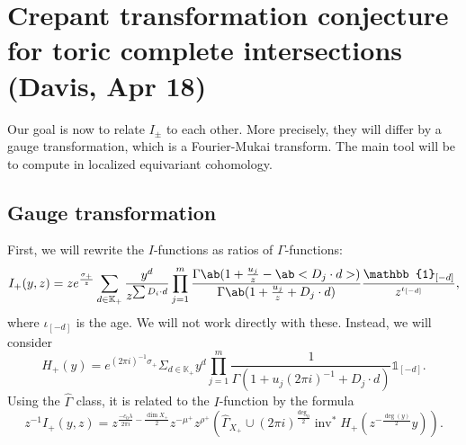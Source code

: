 \documentclass[leqno, openany]{memoir}
\theoremstyle{definition}
\theoremstyle{remark}
\theoremstyle{plain}
\theoremstyle{definition}
\theoremstyle{remark}
\newcommand{\K}{\mathbb{K}}
\newcommand{\on}[1]{\operatorname{#1}}
\newcommand{\wh}[1]{\widehat{#1}}
\begin{document}
\section{Crepant transformation conjecture for toric complete intersections (Davis, Apr 18)}%
\label{sec:Crepant transformation conjecture for toric ci}

Our goal is now to relate $I_{\pm}$ to each other. More precisely, they will differ by a gauge transformation, which is a Fourier-Mukai transform. The main tool will be to compute in localized equivariant cohomology. 

\subsection{Gauge transformation}%
\label{sub:Gauge transformation}

First, we will rewrite the $I$-functions as ratios of $\Gamma$-functions:
\[ I_+(y,z) = ze^{\frac{\sigma_+}{z}} \sum_{d \in \K_+} \frac{y^d}{z^{\sum D_i \cdot d}} \prod_{j=1}^m \frac{\Gamma\ab(1 + \frac{u_j}{z} - \ab<D_j \cdot d>)}{\Gamma\ab(1 + \frac{u_j}{z} + D_j \cdot d)} \frac{\mathbb{1}_{[-d]}}{z^{\iota_{[-d]}}}, \]
where $\iota_{[-d]}$ is the age. We will not work directly with these. Instead, we will consider
\[ H_+(y) = e^{(2\pi i)^{-1} \sigma_+} \Sigma_{d \in \K_+} y^d \prod_{j=1}^m \frac{1}{\Gamma(1 + u_j (2\pi i)^{-1} + D_j \cdot d)} \mathbb{1}_{[-d]}. \]
Using the $\wh{\Gamma}$ class, it is related to the $I$-function by the formula
\[z^{-1} I_+(y,z) = z^{\frac{-c_0 \lambda}{2\pi i} - \frac{\dim X_+}{2}} z^{-\mu^+} z^{\rho^+} (\wh{\Gamma}_{X_+} \cup (2\pi i)^{\frac{\deg_0}{2}} \on{inv}^* H_+(z^{-\frac{\deg(y)}{2}} y)). \]
\end{document}
